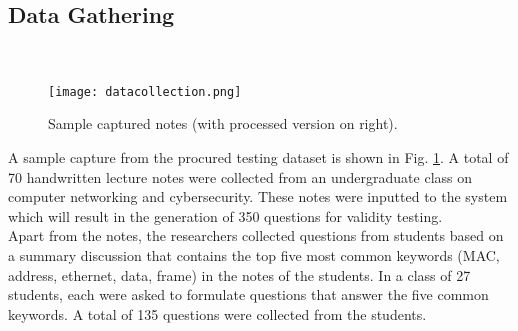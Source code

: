 \documentclass[conference]{IEEEtran}
\begin{document}
    \subsection{Data Gathering}
        \hfill \\
        \vspace{-1cm}
        \begin{figure}[H]
            \centerline{\texttt{[image: datacollection.png]}}
            \vspace{-0.3cm}
            \caption{Sample captured notes (with processed version on right).} 
            \label{datacollection}
        \end{figure} 
        \vspace{-0.3cm} 
        \indent A sample capture from the procured testing dataset 
        is shown in Fig. \ref{datacollection}. 
        A total of 70 handwritten lecture notes were collected
        from an undergraduate class on computer networking and 
        cybersecurity. These notes were inputted to the system 
        which will result in the generation of 350 questions 
        for validity testing. \\ 
        \indent Apart from the notes, the researchers collected 
        questions from students based on a summary discussion that 
        contains the top five most common keywords 
        (MAC, address, ethernet, data, frame) in the notes 
        of the students. In a class of 27 students, each 
        were asked to formulate questions that answer the five 
        common keywords. A total of 135 questions were collected 
        from the students.
\end{document}
